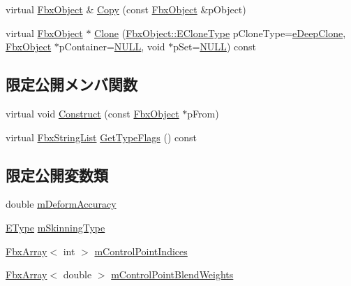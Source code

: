 \begin{DoxyCompactItemize}
\item 
virtual \hyperlink{class_fbx_object}{Fbx\+Object} \& \hyperlink{class_fbx_skin_a858806922c36d1dc2910181a70a67d88}{Copy} (const \hyperlink{class_fbx_object}{Fbx\+Object} \&p\+Object)
\item 
virtual \hyperlink{class_fbx_object}{Fbx\+Object} $\ast$ \hyperlink{class_fbx_skin_ad6699903d1b3ef2ea14769a6e75caeed}{Clone} (\hyperlink{class_fbx_object_a9f5626b2d2135684d6ea1e6e4ad2acbb}{Fbx\+Object\+::\+E\+Clone\+Type} p\+Clone\+Type=\hyperlink{class_fbx_object_a9f5626b2d2135684d6ea1e6e4ad2acbbaacdf137ca059c572798287e98c4236d0}{e\+Deep\+Clone}, \hyperlink{class_fbx_object}{Fbx\+Object} $\ast$p\+Container=\hyperlink{fbxarch_8h_a070d2ce7b6bb7e5c05602aa8c308d0c4}{N\+U\+LL}, void $\ast$p\+Set=\hyperlink{fbxarch_8h_a070d2ce7b6bb7e5c05602aa8c308d0c4}{N\+U\+LL}) const
\end{DoxyCompactItemize}
\subsection*{限定公開メンバ関数}
\begin{DoxyCompactItemize}
\item 
virtual void \hyperlink{class_fbx_skin_aeebbc037507285cdb2e066f420970208}{Construct} (const \hyperlink{class_fbx_object}{Fbx\+Object} $\ast$p\+From)
\item 
virtual \hyperlink{class_fbx_string_list}{Fbx\+String\+List} \hyperlink{class_fbx_skin_a736228a80b5d0db0075527767286be2d}{Get\+Type\+Flags} () const
\end{DoxyCompactItemize}
\subsection*{限定公開変数類}
\begin{DoxyCompactItemize}
\item 
double \hyperlink{class_fbx_skin_acd44c94fca6a292ece5ab324a823a17f}{m\+Deform\+Accuracy}
\item 
\hyperlink{class_fbx_skin_aee398789ebed22fa97269a26c6049a16}{E\+Type} \hyperlink{class_fbx_skin_a2a965fe095919b4e2c9a36ee6ca1fecd}{m\+Skinning\+Type}
\item 
\hyperlink{class_fbx_array}{Fbx\+Array}$<$ int $>$ \hyperlink{class_fbx_skin_aadd471bac4ed7f8d5ea11f9971470b61}{m\+Control\+Point\+Indices}
\item 
\hyperlink{class_fbx_array}{Fbx\+Array}$<$ double $>$ \hyperlink{class_fbx_skin_a60d9415846de9b274db217746a4aacb2}{m\+Control\+Point\+Blend\+Weights}
\end{DoxyCompactItemize}
